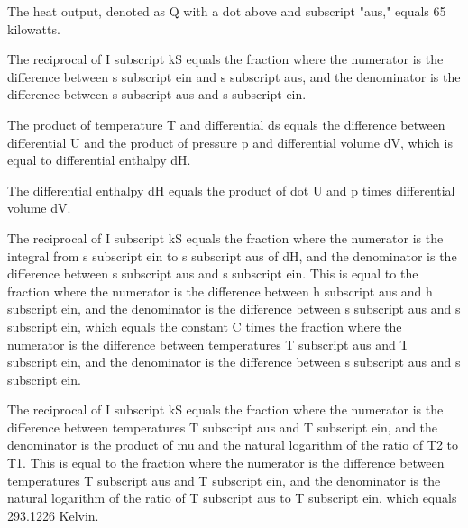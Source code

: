 The heat output, denoted as Q with a dot above and subscript "aus," equals 65 kilowatts.

The reciprocal of I subscript kS equals the fraction where the numerator is the difference between s subscript ein and s subscript aus, and the denominator is the difference between s subscript aus and s subscript ein.

The product of temperature T and differential ds equals the difference between differential U and the product of pressure p and differential volume dV, which is equal to differential enthalpy dH.

The differential enthalpy dH equals the product of dot U and p times differential volume dV.

The reciprocal of I subscript kS equals the fraction where the numerator is the integral from s subscript ein to s subscript aus of dH, and the denominator is the difference between s subscript aus and s subscript ein. This is equal to the fraction where the numerator is the difference between h subscript aus and h subscript ein, and the denominator is the difference between s subscript aus and s subscript ein, which equals the constant C times the fraction where the numerator is the difference between temperatures T subscript aus and T subscript ein, and the denominator is the difference between s subscript aus and s subscript ein.

The reciprocal of I subscript kS equals the fraction where the numerator is the difference between temperatures T subscript aus and T subscript ein, and the denominator is the product of mu and the natural logarithm of the ratio of T2 to T1. This is equal to the fraction where the numerator is the difference between temperatures T subscript aus and T subscript ein, and the denominator is the natural logarithm of the ratio of T subscript aus to T subscript ein, which equals 293.1226 Kelvin.